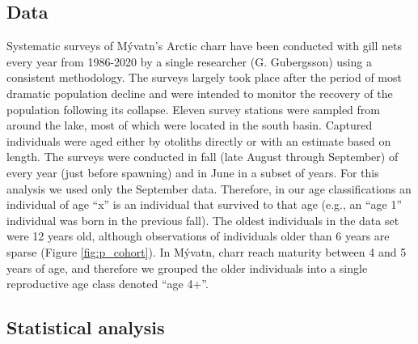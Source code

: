 \subsection*{Data} 

Systematic surveys of M\'{y}vatn’s Arctic charr have been conducted 
with gill nets every year from 1986-2020 by a single researcher (G. Gu{\dh}bergsson) 
using a consistent methodology. 
The surveys largely took place after the period of most dramatic population decline 
\citep{gudbergsson2004} 
and were intended to monitor the recovery of the population following its collapse. 
Eleven survey stations were sampled from around the lake,
most of which were located in the south basin. 
Captured individuals were aged either by otoliths directly or 
with an estimate based on length.
The surveys were conducted in fall (late August through September) 
of every year (just before spawning) and in June in a subset of years. 
For this analysis we used only the September data. 
Therefore, in our age classifications an individual of age ``x'' is an individual 
that survived to that age (e.g., an ``age 1'' individual was born in the previous fall). 
The oldest individuals in the data set were 12 years old, although observations 
of individuals older than 6 years are sparse
(Figure \ref{fig:p_cohort}). 
In M\'{y}vatn, charr reach maturity between 4 and 5 years of age, 
and therefore we grouped the older individuals into a single reproductive age class
denoted ``age 4+''.

\subsection*{Statistical analysis} 


